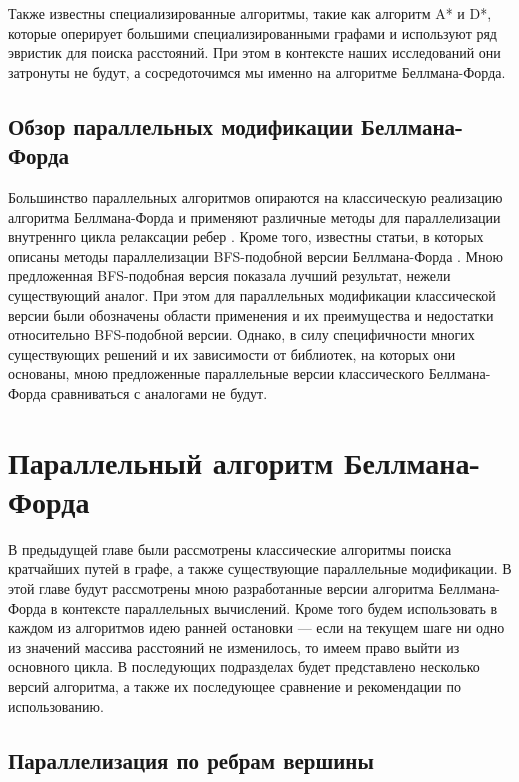 Также известны специализированные алгоритмы, такие как алгоритм A* и D*, которые оперирует большими специализированными графами и используют ряд эвристик для поиска расстояний. При этом в контексте наших исследований они затронуты не будут, а сосредоточимся мы именно на алгоритме Беллмана-Форда.


\FloatBarrier
\subsection{Обзор параллельных модификации Беллмана-Форда}

Большинство параллельных алгоритмов опираются на классическую реализацию алгоритма Беллмана-Форда и применяют различные методы для параллелизации внутреннго цикла релаксации ребер \cite{COHEN}\cite{GAURAV}. Кроме того, известны статьи, в которых описаны методы параллелизации BFS-подобной версии Беллмана-Форда \cite{LIGRA}. Мною предложенная BFS-подобная версия показала лучший результат, нежели существующий аналог. При этом для параллельных модификации классической версии были обозначены области применения и их преимущества и недостатки относительно BFS-подобной версии. Однако, в силу специфичности многих существующих решений и их зависимости от библиотек, на которых они основаны, мною предложенные параллельные версии классического Беллмана-Форда сравниваться с аналогами не будут. 


\FloatBarrier
\section{Параллельный алгоритм Беллмана-Форда}

В предыдущей главе были рассмотрены классические алгоритмы поиска кратчайших путей в графе, а также существующие параллельные модификации. В этой главе будут рассмотрены мною разработанные версии алгоритма Беллмана-Форда в контексте параллельных вычислений. Кроме того будем использовать в каждом из алгоритмов идею ранней остановки --- если на текущем шаге ни одно из значений массива расстояний не изменилось, то имеем право выйти из основного цикла. В последующих подразделах будет представлено несколько версий алгоритма, а также их последующее сравнение и рекомендации по использованию.  

\FloatBarrier
\subsection{Параллелизация по ребрам вершины}

